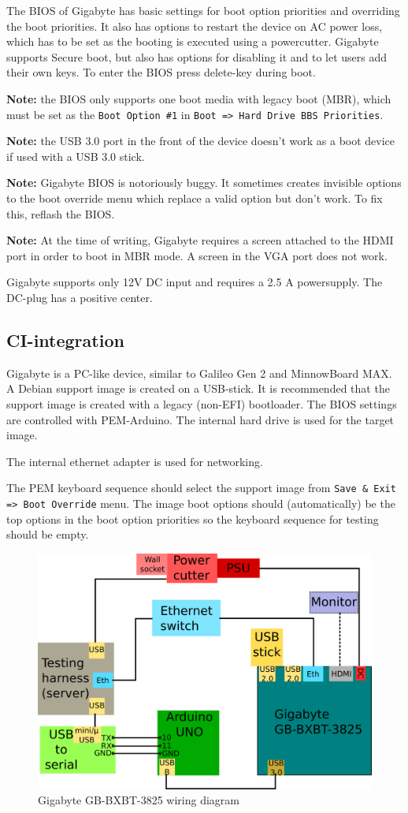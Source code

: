 \documentclass[a4paper,11pt]{article}
\newcommand{\note}{\textbf{Note: }}
\newcommand{\cmd}[1]{\texttt{#1}}
\begin{document}
The BIOS of Gigabyte has basic settings for boot option priorities and overriding the boot priorities. It also has options to restart the device on AC power loss, which has to be set as the booting is executed using a powercutter. Gigabyte supports Secure boot, but also has options for disabling it and to let users add their own keys. To enter the BIOS press delete-key during boot.

\note the BIOS only supports one boot media with legacy boot (MBR), which must be set as the \cmd{Boot Option \#1} in \cmd{Boot => Hard Drive BBS Priorities}.

\note the USB 3.0 port in the front of the device doesn't work as a boot device if used with a USB 3.0 stick.

\note Gigabyte BIOS is notoriously buggy. It sometimes creates invisible options to the boot override menu which replace a valid option but don't work. To fix this, reflash the BIOS.

\note At the time of writing, Gigabyte requires a screen attached to the HDMI port in order to boot in MBR mode. A screen in the VGA port does not work.

Gigabyte supports only 12V DC input and requires a 2.5 A powersupply. The DC-plug has a positive center.

\subsection{CI-integration}
Gigabyte is a PC-like device, similar to Galileo Gen 2 and MinnowBoard MAX. A Debian support image is created on a USB-stick. It is recommended that the support image is created with a legacy (non-EFI) bootloader. The BIOS settings are controlled with PEM-Arduino. The internal hard drive is used for the target image.

The internal ethernet adapter is used for networking.

The PEM keyboard sequence should select the support image from \cmd{Save \& Exit => Boot Override} menu. The image boot options should (automatically) be the top options in the boot option priorities so the keyboard sequence for testing should be empty.

\begin{figure}[h]
	\centering
	\includegraphics[width=0.7\linewidth]{gigabytewiring.png}
	\caption{Gigabyte GB-BXBT-3825 wiring diagram}
	\label{fig:gigabytewiring}
\end{figure}
\end{document}

